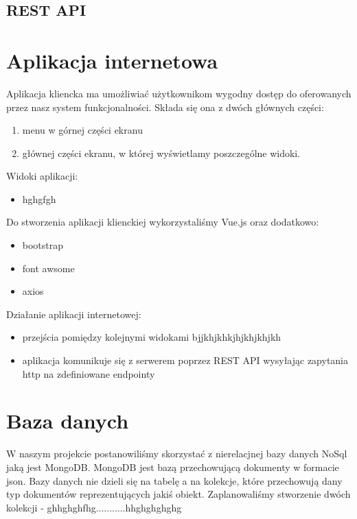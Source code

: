 \documentclass[a4paper, 11pt]{report}
\begin{document}
	\subsection{REST API}
	
	
	\section{Aplikacja internetowa}
	
Aplikacja kliencka ma umożliwiać użytkownikom wygodny dostęp do oferowanych przez nasz system funkcjonalności. 	Składa się ona z dwóch głównych części:
	
	\begin{enumerate}
	\item menu w górnej części ekranu
	\item głównej części ekranu, w której wyświetlamy poszczególne widoki.
	\end{enumerate}
	
\noindent
Widoki aplikacji:
\begin{itemize}
\item hghgfgh
\end{itemize}

\noindent
Do stworzenia aplikacji klienckiej wykorzystaliśmy Vue.js oraz dodatkowo:
\begin{itemize}
\item bootstrap
\item font awsome 
\item axios
\end{itemize}

\noindent
Działanie aplikacji internetowej:
\begin{itemize}
\item przejścia pomiędzy kolejnymi widokami bjjkhjkhkjhjkhjkhjkh
\item aplikacja komunikuje się z serwerem poprzez REST API wysyłając zapytania http na zdefiniowane endpointy
\end{itemize}

	
	\section{Baza danych}
	
W naszym projekcie postanowiliśmy skorzystać z nierelacjnej bazy danych NoSql jaką jest MongoDB. MongoDB jest bazą przechowującą dokumenty w formacie json. Bazy danych nie dzieli się na tabelę a na kolekcje, które przechowują dany typ dokumentów reprezentujących jakiś obiekt. Zaplanowaliśmy stworzenie dwóch kolekcji - ghhghghfhg...........hhghghghghg
		
\end{document}
